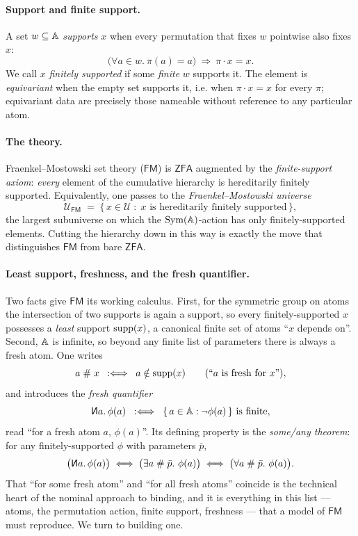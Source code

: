 \paragraph{Support and finite support.}
A set $w\subseteq\mathbb{A}$ \emph{supports} $x$ when every permutation that fixes
$w$ pointwise also fixes $x$:
\[
  \bigl(\forall a\in w.\ \pi(a)=a\bigr)\ \Longrightarrow\ \pi\cdot x = x .
\]
We call $x$ \emph{finitely supported} if some \emph{finite} $w$ supports it.
The element is \emph{equivariant} when the empty set supports it, i.e. when
$\pi\cdot x = x$ for every $\pi$; equivariant data are precisely those nameable
without reference to any particular atom.

\paragraph{The theory.}
Fraenkel--Mostowski set theory ($\mathsf{FM}$) is $\mathsf{ZFA}$ augmented by the
\emph{finite-support axiom}: \emph{every} element of the cumulative hierarchy is
hereditarily finitely supported. Equivalently, one passes to the
\emph{Fraenkel--Mostowski universe}
\[
  \mathcal{U}_{\mathsf{FM}} \;=\;
  \{\, x\in\mathcal{U} \;:\; x \text{ is hereditarily finitely supported}\,\},
\]
the largest subuniverse on which the $\mathrm{Sym}(\mathbb{A})$-action has only
finitely-supported elements. Cutting the hierarchy down in this way is exactly
the move that distinguishes $\mathsf{FM}$ from bare $\mathsf{ZFA}$.

\paragraph{Least support, freshness, and the fresh quantifier.}
Two facts give $\mathsf{FM}$ its working calculus. First, for the symmetric group
on atoms the intersection of two supports is again a support, so every
finitely-supported $x$ possesses a \emph{least} support $\mathrm{supp}(x)$, a canonical
finite set of atoms ``$x$ depends on''. Second, $\mathbb{A}$ is infinite, so beyond
any finite list of parameters there is always a fresh atom. One writes
\[
  a \mathrel{\#} x \;\;:\Longleftrightarrow\;\; a\notin\mathrm{supp}(x)
  \qquad(\text{``$a$ is fresh for $x$''}),
\]
and introduces the \emph{fresh quantifier}
\[
  \new a.\,\phi(a) \;\;:\Longleftrightarrow\;\;
  \{\,a\in\Atoms : \neg\phi(a)\,\}\ \text{is finite},
\]
read ``for a fresh atom $a$, $\phi(a)$''. Its defining property is the
\emph{some/any theorem}: for any finitely-supported $\phi$ with parameters
$\bar p$,
\[
  \bigl(\new a.\,\phi(a)\bigr)
  \;\Longleftrightarrow\;
  \bigl(\exists a\mathrel{\#}\bar p.\ \phi(a)\bigr)
  \;\Longleftrightarrow\;
  \bigl(\forall a\mathrel{\#}\bar p.\ \phi(a)\bigr).
\]
That ``for some fresh atom'' and ``for all fresh atoms'' coincide is the
technical heart of the nominal approach to binding, and it is everything in this
list --- atoms, the permutation action, finite support, freshness --- that a
model of $\mathsf{FM}$ must reproduce. We turn to building one.
